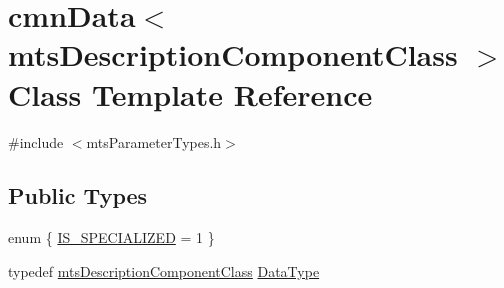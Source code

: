 \hypertarget{classcmn_data_3_01mts_description_component_class_01_4}{}\section{cmn\+Data$<$ mts\+Description\+Component\+Class $>$ Class Template Reference}
\label{classcmn_data_3_01mts_description_component_class_01_4}


{\ttfamily \#include $<$mts\+Parameter\+Types.\+h$>$}

\subsection*{Public Types}
\begin{DoxyCompactItemize}
\item 
enum \{ \hyperlink{classcmn_data_3_01mts_description_component_class_01_4_a43b89b10cd1b3fd4a48c60337710c151a8369bc34b27ba5ebdd2edf6943e2cceb}{I\+S\+\_\+\+S\+P\+E\+C\+I\+A\+L\+I\+Z\+E\+D} = 1
 \}
\item 
typedef \hyperlink{classmts_description_component_class}{mts\+Description\+Component\+Class} \hyperlink{classcmn_data_3_01mts_description_component_class_01_4_a63c14a01f80b214ab860f6a0e04afa31}{Data\+Type}
\end{DoxyCompactItemize}
